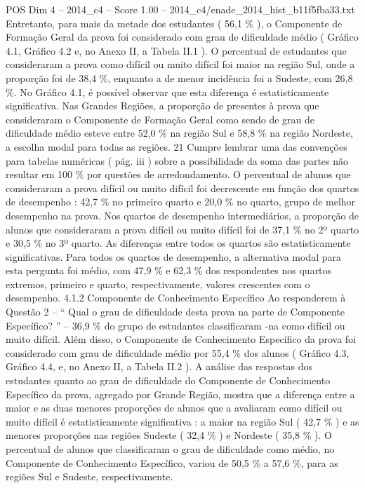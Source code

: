 \begin{textsample}{POS Dim 4 – 2014\_c4 – Score 1.00 – 2014\_c4/enade\_2014\_hist\_b11f5fba33.txt}
Entretanto, para mais da metade dos estudantes ( 56,1 \% ), o Componente de Formação Geral da prova foi considerado com grau de dificuldade médio ( Gráfico 4.1, Gráfico 4.2 e, no Anexo II, a Tabela II.1 ).
O percentual de estudantes que consideraram a prova como difícil ou muito difícil foi maior na região Sul, onde a proporção foi de 38,4 \%, enquanto a de menor incidência foi a Sudeste, com 26,8 \%.
No Gráfico 4.1, é possível observar que esta diferença é estatisticamente significativa.
Nas Grandes Regiões, a proporção de presentes à prova que consideraram o Componente de Formação Geral como sendo de grau de dificuldade médio esteve entre 52,0 \% na região Sul e 58,8 \% na região Nordeste, a escolha modal para todas as regiões. 21 Cumpre lembrar uma das convenções para tabelas numéricas ( pág. iii ) sobre a possibilidade da soma das partes não resultar em 100 \% por questões de arredondamento.
O percentual de alunos que consideraram a prova difícil ou muito difícil foi decrescente em função dos quartos de desempenho : 42,7 \% no primeiro quarto e 20,0 \% no quarto, grupo de melhor desempenho na prova.
Nos quartos de desempenho intermediários, a proporção de alunos que consideraram a prova difícil ou muito difícil foi de 37,1 \% no 2º quarto e 30,5 \% no 3º quarto.
As diferenças entre todos os quartos são estatisticamente significativas.
Para todos os quartos de desempenho, a alternativa modal para esta pergunta foi médio, com 47,9 \% e 62,3 \% dos respondentes nos quartos extremos, primeiro e quarto, respectivamente, valores crescentes com o desempenho. 4.1.2 Componente de Conhecimento Específico Ao responderem à Questão 2 – “ Qual o grau de dificuldade desta prova na parte de Componente Específico? ” – 36,9 \% do grupo de estudantes classificaram -na como difícil ou muito difícil.
Além disso, o Componente de Conhecimento Específico da prova foi considerado com grau de dificuldade médio por 55,4 \% dos alunos ( Gráfico 4.3, Gráfico 4.4, e, no Anexo II, a Tabela II.2 ).
A análise das respostas dos estudantes quanto ao grau de dificuldade do Componente de Conhecimento Específico da prova, agregado por Grande Região, mostra que a diferença entre a maior e as duas menores proporções de alunos que a avaliaram como difícil ou muito difícil é estatisticamente significativa : a maior na região Sul ( 42,7 \% ) e as menores proporções nas regiões Sudeste ( 32,4 \% ) e Nordeste ( 35,8 \% ).
O percentual de alunos que classificaram o grau de dificuldade como médio, no Componente de Conhecimento Específico, variou de 50,5 \% a 57,6 \%, para as regiões Sul e Sudeste, respectivamente.

\end{textsample}
